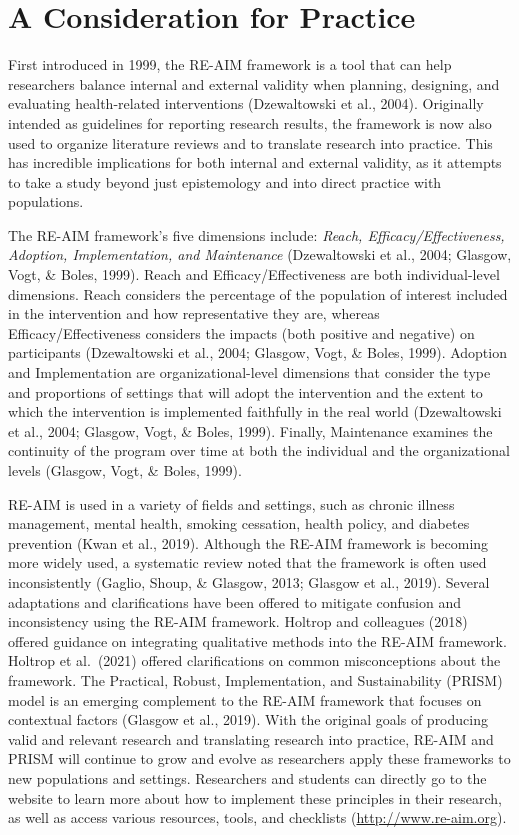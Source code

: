 \documentclass[
  11pt,
]{book}
\begin{document}
\section{A Consideration for Practice}\label{a-consideration-for-practice}

First introduced in 1999, the RE-AIM framework is a tool that can help researchers balance internal and external validity when planning, designing, and evaluating health-related interventions (Dzewaltowski et al., 2004). Originally intended as guidelines for reporting research results, the framework is now also used to organize literature reviews and to translate research into practice. This has incredible implications for both internal and external validity, as it attempts to take a study beyond just epistemology and into direct practice with populations.

The RE-AIM framework's five dimensions include: \emph{Reach, Efficacy/Effectiveness, Adoption, Implementation, and Maintenance} (Dzewaltowski et al., 2004; Glasgow, Vogt, \& Boles, 1999). Reach and Efficacy/Effectiveness are both individual-level dimensions. Reach considers the percentage of the population of interest included in the intervention and how representative they are, whereas Efficacy/Effectiveness considers the impacts (both positive and negative) on participants (Dzewaltowski et al., 2004; Glasgow, Vogt, \& Boles, 1999). Adoption and Implementation are organizational-level dimensions that consider the type and proportions of settings that will adopt the intervention and the extent to which the intervention is implemented faithfully in the real world (Dzewaltowski et al., 2004; Glasgow, Vogt, \& Boles, 1999). Finally, Maintenance examines the continuity of the program over time at both the individual and the organizational levels (Glasgow, Vogt, \& Boles, 1999).

RE-AIM is used in a variety of fields and settings, such as chronic illness management, mental health, smoking cessation, health policy, and diabetes prevention (Kwan et al., 2019). Although the RE-AIM framework is becoming more widely used, a systematic review noted that the framework is often used inconsistently (Gaglio, Shoup, \& Glasgow, 2013; Glasgow et al., 2019). Several adaptations and clarifications have been offered to mitigate confusion and inconsistency using the RE-AIM framework. Holtrop and colleagues (2018) offered guidance on integrating qualitative methods into the RE-AIM framework. Holtrop et al.~(2021) offered clarifications on common misconceptions about the framework. The Practical, Robust, Implementation, and Sustainability (PRISM) model is an emerging complement to the RE-AIM framework that focuses on contextual factors (Glasgow et al., 2019). With the original goals of producing valid and relevant research and translating research into practice, RE-AIM and PRISM will continue to grow and evolve as researchers apply these frameworks to new populations and settings. Researchers and students can directly go to the website to learn more about how to implement these principles in their research, as well as access various resources, tools, and checklists (\url{http://www.re-aim.org}).
\end{document}
